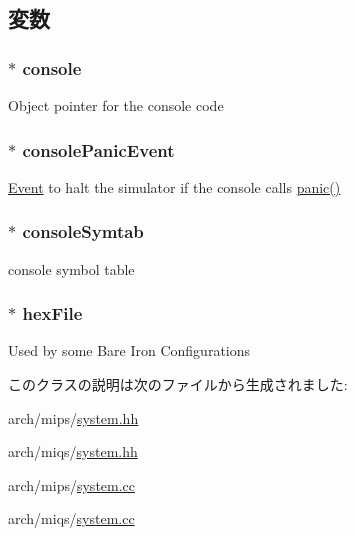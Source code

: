 \subsection{変数}
\hypertarget{classMipsSystem_ac1fd76adeba49aea2ab70e0cba58d9d0}{
\subsubsection[{console}]{$\ast$ {\bf console}}}
\label{classMipsSystem_ac1fd76adeba49aea2ab70e0cba58d9d0}
Object pointer for the console code \hypertarget{classMipsSystem_a0266101e4c5bb3cef386e47221ba7f83}{
\subsubsection[{consolePanicEvent}]{$\ast$ {\bf consolePanicEvent}}}
\label{classMipsSystem_a0266101e4c5bb3cef386e47221ba7f83}
\hyperlink{classEvent}{Event} to halt the simulator if the console calls \hyperlink{base_2misc_8hh_a1445e207e36c97ff84c54b47288cea19}{panic()} \hypertarget{classMipsSystem_a112883d2eb9b5a5c79f3717e73a15dbb}{
\subsubsection[{consoleSymtab}]{$\ast$ {\bf consoleSymtab}}}
\label{classMipsSystem_a112883d2eb9b5a5c79f3717e73a15dbb}
console symbol table \hypertarget{classMipsSystem_a09784a3946cc01ec7abea0b520953c5c}{
\subsubsection[{hexFile}]{$\ast$ {\bf hexFile}}}
\label{classMipsSystem_a09784a3946cc01ec7abea0b520953c5c}
Used by some Bare Iron Configurations 

このクラスの説明は次のファイルから生成されました:\begin{DoxyCompactItemize}
\item 
arch/mips/\hyperlink{arch_2mips_2system_8hh}{system.hh}\item 
arch/miqs/\hyperlink{arch_2miqs_2system_8hh}{system.hh}\item 
arch/mips/\hyperlink{arch_2mips_2system_8cc}{system.cc}\item 
arch/miqs/\hyperlink{arch_2miqs_2system_8cc}{system.cc}\end{DoxyCompactItemize}
